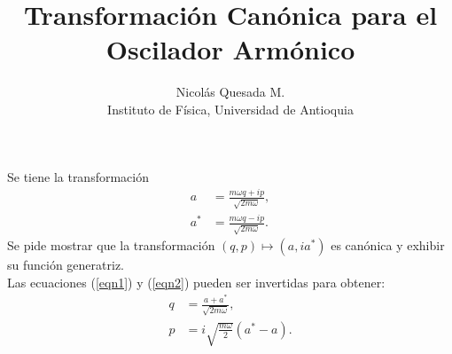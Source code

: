\documentclass[letterpaper,12pt]{article}
\title{Transformaci\'on Can\'onica para el Oscilador Arm\'onico}
\author{Nicol\'as Quesada M.\\{\small \sf Instituto de F\'isica, Universidad de Antioquia}}
\date{}
\begin{document}
\maketitle

Se tiene la transformaci\'on 
\begin{subequations}
\begin{align}
a&=\frac{ m \omega q + i p }{
   \sqrt{ 2 m \omega }} ,
\label{eqn1}
\\
a^*&=\frac{ m \omega q - i p}{
   \sqrt{ 2m \omega }} .
\label{eqn2}
\end{align}
\end{subequations}
Se pide mostrar que la transformaci\'on $(q,p)\longmapsto(a,ia^{*})$ es can\'onica y exhibir su funci\'on generatriz.\\

Las ecuaciones (\ref{eqn1}) y (\ref{eqn2}) pueden ser invertidas para obtener:
\begin{subequations}
\begin{align}
q&=\frac{ a +a^* }{\sqrt{2 m \omega}},\\
p&=i  \sqrt{\frac{m \omega}{2}} \left(a^* -a \right).
\end{align}
\end{subequations}
\end{document}
